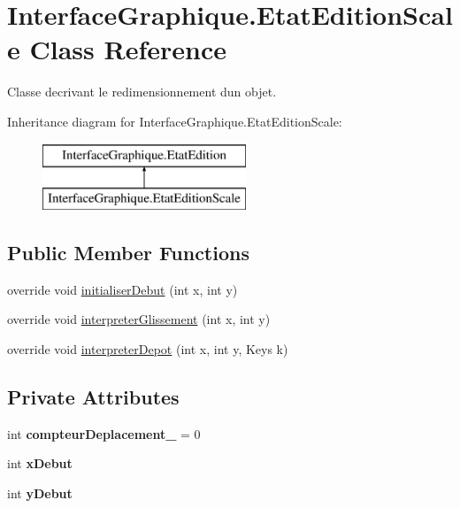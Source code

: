 \hypertarget{class_interface_graphique_1_1_etat_edition_scale}{}\section{Interface\+Graphique.\+Etat\+Edition\+Scale Class Reference}
\label{class_interface_graphique_1_1_etat_edition_scale}


Classe decrivant le redimensionnement d\textquotesingle{}un objet.  


Inheritance diagram for Interface\+Graphique.\+Etat\+Edition\+Scale\+:\begin{figure}[H]
\begin{center}
\leavevmode
\includegraphics[height=2.000000cm]{class_interface_graphique_1_1_etat_edition_scale}
\end{center}
\end{figure}
\subsection*{Public Member Functions}
\begin{DoxyCompactItemize}
\item 
override void \hyperlink{group__inf2990_ga057a0ff30fb70346d9e0ddb1d5ac1b8b}{initialiser\+Debut} (int x, int y)
\item 
override void \hyperlink{group__inf2990_ga712e07a2dcedbeed91dbeba8223c5346}{interpreter\+Glissement} (int x, int y)
\item 
override void \hyperlink{group__inf2990_ga4160cdd47c40c9bd4879240c34e3c459}{interpreter\+Depot} (int x, int y, Keys k)
\end{DoxyCompactItemize}
\subsection*{Private Attributes}
\begin{DoxyCompactItemize}
\item 
int {\bfseries compteur\+Deplacement\+\_\+} = 0
\item 
int {\bfseries x\+Debut}
\item 
int {\bfseries y\+Debut}
\end{DoxyCompactItemize}
